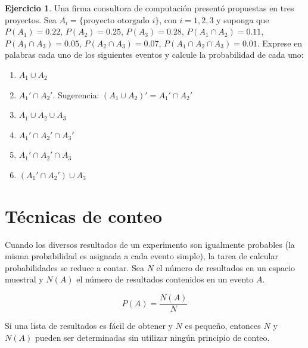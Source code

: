 \documentclass[
  11pt,
]{book}
\providecommand{\tightlist}{%
  \setlength{\itemsep}{0pt}\setlength{\parskip}{0pt}}
\theoremstyle{definition}
\theoremstyle{definition}
\theoremstyle{definition}
\newtheorem{exercise}{Ejercicio}[chapter]
\theoremstyle{definition}
\theoremstyle{remark}
\begin{document}
\begin{exercise}

Una firma consultora de computación presentó propuestas en tres proyectos. Sea \(A_i = \{ \text{proyecto otorgado } i \}\), con \(i = 1, 2, 3\) y suponga que \(P(A_1) = 0.22\), \(P(A_2) = 0.25\), \(P(A_3) = 0.28\), \(P(A_1 \cap A_2) = 0.11\), \(P(A_1 \cap A_3) = 0.05\), \(P(A_2 \cap A_3) = 0.07\), \(P(A_1 \cap A_2 \cap A_3) = 0.01\). Exprese en palabras cada uno de los siguientes eventos y calcule la probabilidad de cada uno:

\begin{enumerate}
\def\labelenumi{\arabic{enumi}.}
\tightlist
\item
  \(A_1 \cup A_2\)\\
\item
  \(A_1' \cap A_2'\). Sugerencia: \((A_1 \cup A_2)' = A_1' \cap A_2'\)
\item
  \(A_1 \cup A_2 \cup A_3\)\\
\item
  \(A_1' \cap A_2' \cap A_3'\)\\
\item
  \(A_1' \cap A_2' \cap A_3\)\\
\item
  \((A_1' \cap A_2') \cup A_3\)\\
\end{enumerate}

\end{exercise}

\section{Técnicas de conteo}\label{probabilidad-tecnicas-conteo}

Cuando los diversos resultados de un experimento son igualmente probables (la misma probabilidad es asignada a cada evento simple), la tarea de calcular probabilidades se reduce a contar. Sea \(N\) el número de resultados en un espacio muestral y \(N(A)\) el número de resultados contenidos en un evento \(A\). \citep[página 59]{Devore}

\begin{equation}
P(A) = \frac{N(A)}{N}
\label{eq:conteo-caso-equiprobable}
\end{equation}

Si una lista de resultados es fácil de obtener y \(N\) es pequeño, entonces \(N\) y \(N(A)\) pueden ser determinadas sin utilizar ningún principio de conteo.
\end{document}

